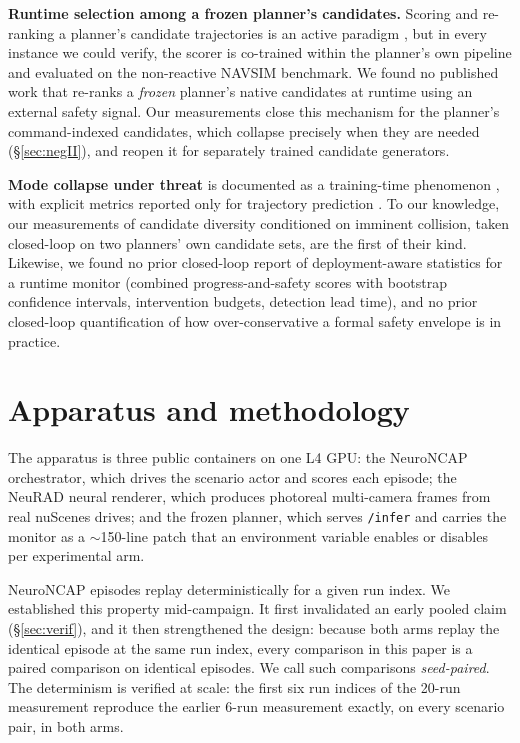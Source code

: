 \documentclass[11pt]{article}
\begin{document}
\textbf{Runtime selection among a frozen planner's candidates.} Scoring and re-ranking a
planner's candidate trajectories is an active paradigm \cite{diver,gtrs,diffusiondrive}, but
in every instance we could verify, the scorer is co-trained within the planner's own pipeline
and evaluated on the non-reactive NAVSIM benchmark. We found no published work that re-ranks a
\emph{frozen} planner's native candidates at runtime using an external safety signal. Our
measurements close this mechanism for the planner's command-indexed candidates, which collapse
precisely when they are needed (\S\ref{sec:negII}), and reopen it for separately trained
candidate generators.

\textbf{Mode collapse under threat} is documented as a training-time phenomenon
\cite{awta}, with explicit metrics reported only for trajectory prediction
\cite{modecollapse}. To our knowledge, our measurements of candidate diversity conditioned on
imminent collision, taken closed-loop on two planners' own candidate sets, are the first of
their kind. Likewise, we found no prior closed-loop report of deployment-aware statistics for
a runtime monitor (combined progress-and-safety scores with bootstrap confidence intervals,
intervention budgets, detection lead time), and no prior closed-loop quantification of how
over-conservative a formal safety envelope \cite{rss} is in practice.

\section{Apparatus and methodology}\label{sec:apparatus}
The apparatus is three public containers on one L4 GPU: the NeuroNCAP orchestrator, which
drives the scenario actor and scores each episode; the NeuRAD neural renderer, which produces
photoreal multi-camera frames from real nuScenes drives; and the frozen planner, which serves
\texttt{/infer} and carries the monitor as a $\sim$150-line patch that an environment variable
enables or disables per experimental arm.

NeuroNCAP episodes replay deterministically for a given run index. We established this
property mid-campaign. It first invalidated an early pooled claim (\S\ref{sec:verif}), and it
then strengthened the design: because both arms replay the identical episode at the same run
index, every comparison in this paper is a paired comparison on identical episodes. We call
such comparisons \emph{seed-paired}. The determinism is verified at scale: the first six run
indices of the 20-run measurement reproduce the earlier 6-run measurement exactly, on every
scenario pair, in both arms.
\end{document}
